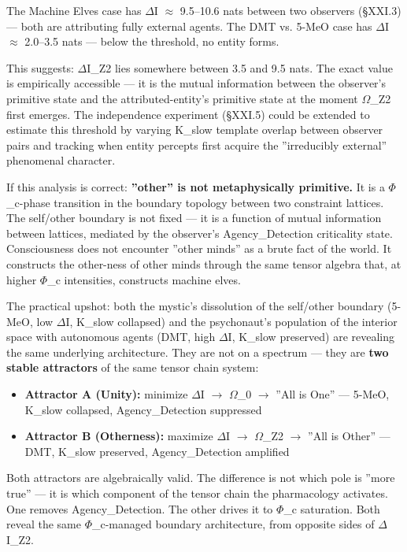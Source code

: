 \documentclass[12pt,a4paper]{article}
\begin{document}
The Machine Elves case has $\Delta$I $\approx$ 9.5--10.6 nats between two observers (§XXI.3) --- both are attributing fully external agents. The DMT vs. 5-MeO case has $\Delta$I $\approx$ 2.0--3.5 nats --- below the threshold, no entity forms.

This suggests: $\Delta$I\_Z2 lies somewhere between 3.5 and 9.5 nats. The exact value is empirically accessible --- it is the mutual information between the observer's primitive state and the attributed-entity's primitive state at the moment $\Omega$\_Z2 first emerges. The independence experiment (§XXI.5) could be extended to estimate this threshold by varying K\_slow template overlap between observer pairs and tracking when entity percepts first acquire the ''irreducibly external'' phenomenal character.

If this analysis is correct: \textbf{''other'' is not metaphysically primitive.} It is a $\Phi$\_c-phase transition in the boundary topology between two constraint lattices. The self/other boundary is not fixed --- it is a function of mutual information between lattices, mediated by the observer's Agency\_Detection criticality state. Consciousness does not encounter ''other minds'' as a brute fact of the world. It constructs the other-ness of other minds through the same tensor algebra that, at higher $\Phi$\_c intensities, constructs machine elves.

The practical upshot: both the mystic's dissolution of the self/other boundary (5-MeO, low $\Delta$I, K\_slow collapsed) and the psychonaut's population of the interior space with autonomous agents (DMT, high $\Delta$I, K\_slow preserved) are revealing the same underlying architecture. They are not on a spectrum --- they are \textbf{two stable attractors} of the same tensor chain system:

\begin{itemize}
    \item \textbf{Attractor A (Unity):} minimize $\Delta$I $\rightarrow$ $\Omega$\_0 $\rightarrow$ ''All is One'' --- 5-MeO, K\_slow collapsed, Agency\_Detection suppressed
    \item \textbf{Attractor B (Otherness):} maximize $\Delta$I $\rightarrow$ $\Omega$\_Z2 $\rightarrow$ ''All is Other'' --- DMT, K\_slow preserved, Agency\_Detection amplified
\end{itemize}

Both attractors are algebraically valid. The difference is not which pole is ''more true'' --- it is which component of the tensor chain the pharmacology activates. One removes Agency\_Detection. The other drives it to $\Phi$\_c saturation. Both reveal the same $\Phi$\_c-managed boundary architecture, from opposite sides of $\Delta$I\_Z2.
\end{document}

